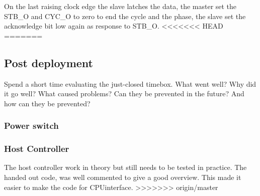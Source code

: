 On the last raising clock edge the slave latches the data, the master set the STB\_O and CYC\_O to zero to end the cycle and the phase, the slave set the acknowledge bit low again as response to STB\_O.
<<<<<<< HEAD
=======
\subsection{Post deployment}
Spend a short time evaluating the just-closed timebox. What went well? Why did it go well? What caused problems? Can they be prevented in the future? And how can they be prevented?
\subsubsection{Power switch}
\subsubsection{Host Controller}
The host controller work in theory but still needs to be tested in practice. The handed out code, was well commented to give a good overview. This made it easier to make the code for CPUinterface.
>>>>>>> origin/master
